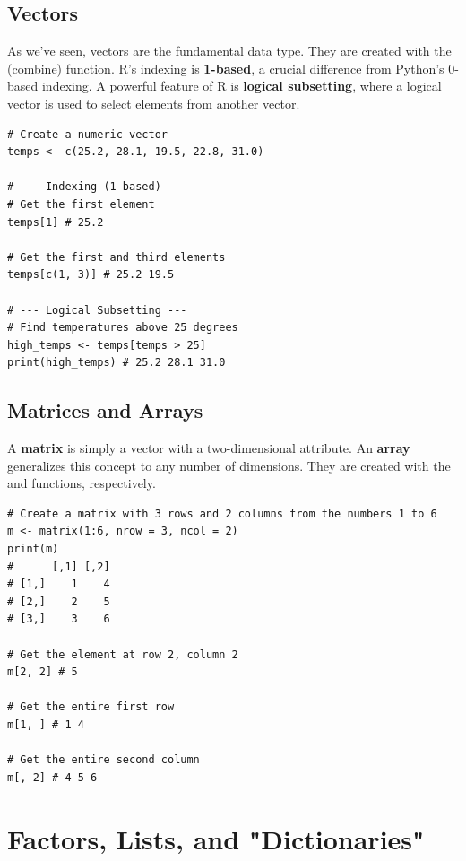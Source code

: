 \subsection*{Vectors}
As we've seen, vectors are the fundamental data type. They are created with the  (combine) function. R's indexing is \textbf{1-based}, a crucial difference from Python's 0-based indexing. A powerful feature of R is \textbf{logical subsetting}, where a logical vector is used to select elements from another vector.

\begin{example}
\text{ }\begin{verbatim}
# Create a numeric vector
temps <- c(25.2, 28.1, 19.5, 22.8, 31.0)

# --- Indexing (1-based) ---
# Get the first element
temps[1] # 25.2

# Get the first and third elements
temps[c(1, 3)] # 25.2 19.5

# --- Logical Subsetting ---
# Find temperatures above 25 degrees
high_temps <- temps[temps > 25]
print(high_temps) # 25.2 28.1 31.0
\end{verbatim}
\end{example}

\subsection*{Matrices and Arrays}
A \textbf{matrix} is simply a vector with a two-dimensional  attribute. An \textbf{array} generalizes this concept to any number of dimensions. They are created with the  and  functions, respectively.

\begin{example}
\text{ }\begin{verbatim}
# Create a matrix with 3 rows and 2 columns from the numbers 1 to 6
m <- matrix(1:6, nrow = 3, ncol = 2)
print(m)
#      [,1] [,2]
# [1,]    1    4
# [2,]    2    5
# [3,]    3    6

# Get the element at row 2, column 2
m[2, 2] # 5

# Get the entire first row
m[1, ] # 1 4

# Get the entire second column
m[, 2] # 4 5 6
\end{verbatim}
\end{example}


\section{Factors, Lists, and "Dictionaries"}
\label{sec:r_factors_lists}

